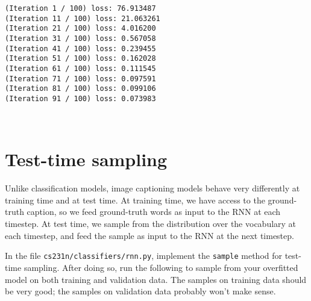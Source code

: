 \documentclass[11pt]{article}
\begin{document}
    \begin{Verbatim}[commandchars=\\\{\}]
(Iteration 1 / 100) loss: 76.913487
(Iteration 11 / 100) loss: 21.063261
(Iteration 21 / 100) loss: 4.016200
(Iteration 31 / 100) loss: 0.567058
(Iteration 41 / 100) loss: 0.239455
(Iteration 51 / 100) loss: 0.162028
(Iteration 61 / 100) loss: 0.111545
(Iteration 71 / 100) loss: 0.097591
(Iteration 81 / 100) loss: 0.099106
(Iteration 91 / 100) loss: 0.073983

    \end{Verbatim}

    \begin{center}
    \end{center}
    { \hspace*{\fill} \\}
    
    \hypertarget{test-time-sampling}{%
\section{Test-time sampling}\label{test-time-sampling}}

Unlike classification models, image captioning models behave very
differently at training time and at test time. At training time, we have
access to the ground-truth caption, so we feed ground-truth words as
input to the RNN at each timestep. At test time, we sample from the
distribution over the vocabulary at each timestep, and feed the sample
as input to the RNN at the next timestep.

In the file \texttt{cs231n/classifiers/rnn.py}, implement the
\texttt{sample} method for test-time sampling. After doing so, run the
following to sample from your overfitted model on both training and
validation data. The samples on training data should be very good; the
samples on validation data probably won't make sense.
\end{document}
